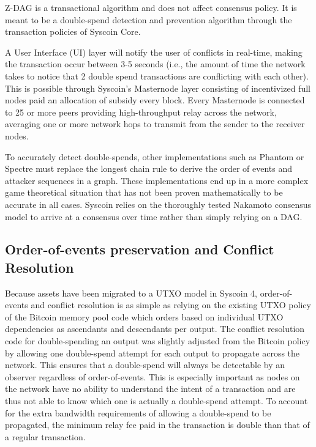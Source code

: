 \documentclass[peerreview]{ieeesyscoin}
\begin{document}
Z-DAG is a transactional algorithm and does not affect consensus policy. It is meant to be a double-spend detection and prevention algorithm through the transaction policies of Syscoin Core.

A User Interface (UI) layer will notify the user of conflicts in real-time, making the transaction occur between 3-5 seconds (i.e., the amount of time the network takes to notice that 2 double spend transactions are conflicting with each other). This is possible through Syscoin’s Masternode layer consisting of incentivized full nodes paid an allocation of subsidy every block. Every Masternode is connected to 25 or more peers providing high-throughput relay across the network, averaging one or more network hops to transmit from the sender to the receiver nodes.

To accurately detect double-spends, other implementations such as Phantom \cite{Som18} or Spectre \cite{Som15} must replace the longest chain rule to derive the order of events and attacker sequences in a graph.
These implementations end up in a more complex game theoretical situation that has not  been proven mathematically to be accurate in all cases. Syscoin relies on the thoroughly tested Nakamoto consensus model to arrive at a consensus over time rather than simply relying on a DAG.

\subsection{Order-of-events preservation and Conflict Resolution}
Because assets have been migrated to a UTXO model in Syscoin 4, order-of-events and conflict resolution is as simple as relying on the existing UTXO policy of the Bitcoin memory pool code which orders based on individual UTXO dependencies as ascendants and descendants per output. The conflict resolution code for double-spending an output was slightly adjusted from the Bitcoin policy by allowing one double-spend attempt for each output to propagate across the network. This ensures that a double-spend will always be detectable by an observer regardless of order-of-events. This is especially important as nodes on the network have no ability to understand the intent of a transaction and are thus not able to know which one is actually a double-spend attempt. To account for the extra bandwidth requirements of allowing a double-spend to be propagated, the minimum relay fee paid in the transaction is double than that of a regular transaction. 
\end{document}
